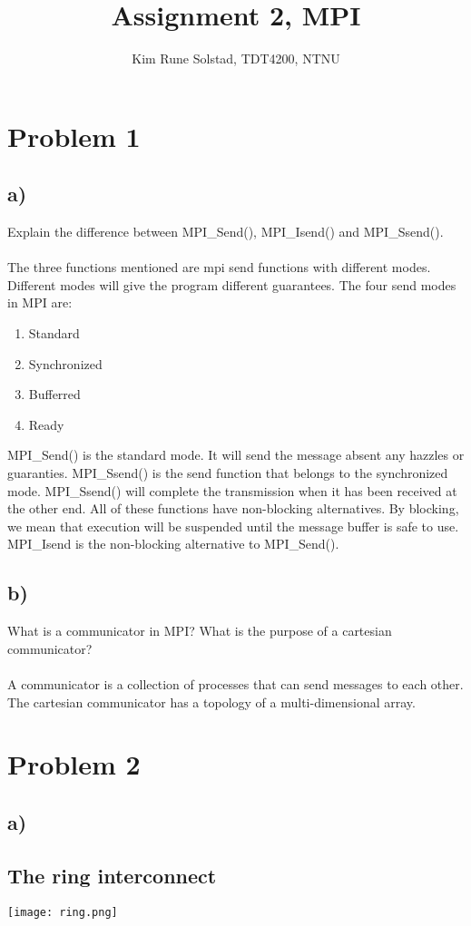 \documentclass[a4paper, 11pt, english]{article}
\author{Kim Rune Solstad, TDT4200, NTNU}
\title{Assignment 2, MPI}
\begin{document}
\maketitle
\section*{Problem 1}
\subsection{a)}
Explain the difference between MPI\_Send(), MPI\_Isend() and MPI\_Ssend().
\\
\\
The three functions mentioned are mpi send functions with different modes. Different modes will give the program different guarantees. The four send modes in MPI are:
\begin{enumerate}
	\item Standard
	\item Synchronized
	\item Bufferred
	\item Ready
\end{enumerate}

MPI\_Send() is the standard mode. It will send the message absent any hazzles or guaranties. MPI\_Ssend() is the send function that belongs to the synchronized mode. MPI\_Ssend() will complete the transmission when it has been received at the other end. All of these functions have non-blocking alternatives. By blocking, we mean that execution will be suspended until the message buffer is safe to use. MPI\_Isend is the non-blocking alternative to MPI\_Send(). 
\subsection{b)}
What is a communicator in MPI? What is the purpose of a cartesian communicator?
\\\\
A communicator is a collection of processes that can send messages to each other. The cartesian communicator has a topology of a multi-dimensional array.

\section*{Problem 2}
\subsection*{a)}
\subsection*{The ring interconnect}
	\texttt{[image: ring.png]}
\end{document}

